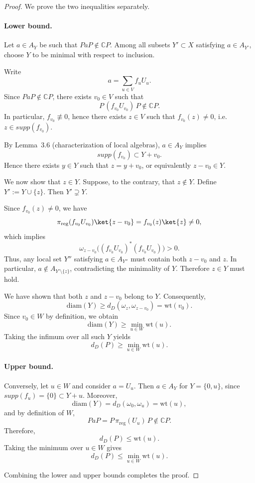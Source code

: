\documentclass[12pt]{article}
\theoremstyle{definition} %
\theoremstyle{plain} %
\theoremstyle{remark} %
\theoremstyle{underline}
\begin{document}
\cc*

\begin{proof}
We prove the two inequalities separately.

\paragraph{Lower bound.}
Let $a\in A_Y$ be such that $PaP\notin\mathbb CP$.
Among all subsets $Y'\subset X$ satisfying $a\in A_{Y'}$, choose $Y$ to be minimal
with respect to inclusion.

Write
\[
a=\sum_{u\in V} f_uU_u.
\]
Since $PaP\notin\mathbb CP$, there exists $v_0\in V$ such that
\[
P\,(f_{v_0}U_{v_0})\,P\notin\mathbb CP.
\]
In particular, $f_{v_0}\not\equiv 0$, hence there exists $z\in V$ such that
$f_{v_0}(z)\neq 0$, i.e.\ $z\in supp(f_{v_0})$.

By Lemma~3.6 (characterization of local algebras), $a\in A_Y$ implies
\[
supp(f_{v_0})\subset Y+v_0.
\]
Hence there exists $y\in Y$ such that $z=y+v_0$, or equivalently $z-v_0\in Y$.

We now show that $z\in Y$.
Suppose, to the contrary, that $z\notin Y$.
Define $Y':=Y\cup\{z\}$.
Then $Y'\supsetneq Y$.

Since $f_{v_0}(z)\neq 0$, we have
\[
\pi_{\mathrm{reg}}(f_{v_0}U_{v_0})\ket{z-v_0}
= f_{v_0}(z)\ket{z}\neq 0,
\]
which implies
\[
\omega_{z-v_0}\bigl((f_{v_0}U_{v_0})^*(f_{v_0}U_{v_0})\bigr)>0.
\]
Thus, any local set $Y''$ satisfying $a\in A_{Y''}$ must contain both $z-v_0$ and $z$.
In particular, $a\notin A_{Y'\setminus\{z\}}$, contradicting the minimality of $Y$.
Therefore $z\in Y$ must hold.

We have shown that both $z$ and $z-v_0$ belong to $Y$.
Consequently,
\[
\mathrm{diam}(Y)\ge d_D(\omega_z,\omega_{z-v_0})=\mathrm{wt}(v_0).
\]
Since $v_0\in W$ by definition, we obtain
\[
\mathrm{diam}(Y)\ge \min_{u\in W}\mathrm{wt}(u).
\]
Taking the infimum over all such $Y$ yields
\[
d_D(P)\ge \min_{u\in W}\mathrm{wt}(u).
\]

\paragraph{Upper bound.}
Conversely, let $u\in W$ and consider $a=U_u$.
Then $a\in A_Y$ for $Y=\{0,u\}$, since $supp(f_u)=\{0\}\subset Y+u$.
Moreover,
\[
\mathrm{diam}(Y)=d_D(\omega_0,\omega_u)=\mathrm{wt}(u),
\]
and by definition of $W$,
\[
PaP=P\,\pi_{\mathrm{reg}}(U_u)\,P\notin\mathbb CP.
\]
Therefore,
\[
d_D(P)\le \mathrm{wt}(u).
\]
Taking the minimum over $u\in W$ gives
\[
d_D(P)\le \min_{u\in W}\mathrm{wt}(u).
\]

Combining the lower and upper bounds completes the proof.
\end{proof}
\end{document}

